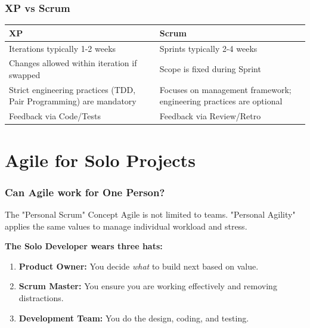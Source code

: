 \documentclass[xcolor=table]{beamer}
\begin{document}
\begin{frame}
    \frametitle{XP vs Scrum}
    \begin{table}
        \centering
        \begin{tabular}{|p{}|p{}|}
            \hline
            \textbf{XP} & \textbf{Scrum} \\
            \hline
            Iterations typically 1-2 weeks & Sprints typically 2-4 weeks \\
            Changes allowed within iteration if swapped & Scope is fixed during Sprint \\
            Strict engineering practices (TDD, Pair Programming) are mandatory & Focuses on management framework; engineering practices are optional \\
            Feedback via Code/Tests & Feedback via Review/Retro \\
            \hline
        \end{tabular}
    \end{table}
\end{frame}

\section{Agile for Solo Projects}

\begin{frame}
    \frametitle{Can Agile work for One Person?}
    \begin{block}{The "Personal Scrum" Concept}
        Agile is not limited to teams. "Personal Agility" applies the same values to manage individual workload and stress.
    \end{block}
    \vspace{0.5cm}
    \textbf{The Solo Developer wears three hats:}
    \begin{enumerate}
        \item \textbf{Product Owner:} You decide \textit{what} to build next based on value.
        \item \textbf{Scrum Master:} You ensure you are working effectively and removing distractions.
        \item \textbf{Development Team:} You do the design, coding, and testing.
    \end{enumerate}
\end{frame}
\end{document}
